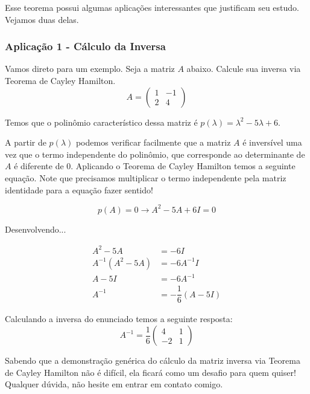 \documentclass[12pt]{article}
\begin{document}
	Esse teorema possui algumas aplicações interessantes que justificam seu estudo. Vejamos duas delas.
	\subsubsection{Aplicação 1 - Cálculo da Inversa}
	
	Vamos direto para um exemplo. Seja a matriz $A$ abaixo. Calcule sua inversa via Teorema de Cayley Hamilton.
	\begin{equation*}
		A=\begin{pmatrix}
			1&-1\\
			2&4
		\end{pmatrix}
	\end{equation*}
	
	Temos que o polinômio característico dessa matriz é $p(\lambda)=\lambda^2-5\lambda+6$.
	
	A partir de $p(\lambda)$ podemos verificar facilmente que a matriz $A$ é inversível uma vez que o termo independente do polinômio, que corresponde ao determinante de $A$ é diferente de 0. Aplicando o Teorema de Cayley Hamilton temos a seguinte equação. Note que precisamos multiplicar o termo independente pela matriz identidade para a equação fazer sentido!
	
	\begin{equation*}
		p(A)=0\rightarrow A^2-5A+6I=0
	\end{equation*}
	
	Desenvolvendo...
	
	\begin{align*}
		A^2-5A&=-6I\\
		A^{-1}(A^2-5A)&=-6A^{-1}I\\
		A-5I&=-6A^{-1}\\
		A^{-1}&=-\dfrac{1}{6}(A-5I)
	\end{align*}
	
	Calculando a inversa do enunciado temos a seguinte resposta:
	\begin{equation*}
		A^{-1}=\dfrac{1}{6}
		\begin{pmatrix}
			4&1\\
			-2&1
		\end{pmatrix}
	\end{equation*}
	
	Sabendo que a demonstração genérica do cálculo da matriz inversa via Teorema de Cayley Hamilton não é difícil, ela ficará como um desafio para quem quiser! Qualquer dúvida, não hesite em entrar em contato comigo.
	
\end{document}
